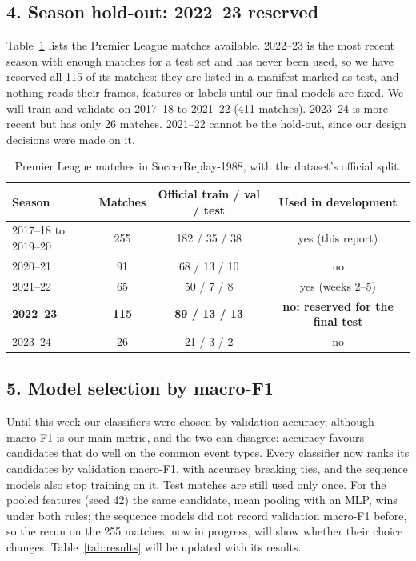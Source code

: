 \documentclass[11pt]{article}
\begin{document}
\subsection*{4. Season hold-out: 2022--23 reserved}
Table~\ref{tab:seasons} lists the Premier League matches available. 2022--23 is the most recent season with
enough matches for a test set and has never been used, so we have reserved all 115 of its matches: they are
listed in a manifest marked as test, and nothing reads their frames, features or labels until our final
models are fixed. We will train and validate on 2017--18 to 2021--22 (411 matches). 2023--24 is more recent
but has only 26 matches. 2021--22 cannot be the hold-out, since our design decisions were made on it.

\begin{table}[h]
\centering\small
\begin{tabular}{lccc}
\toprule
Season & Matches & Official train / val / test & Used in development\\
\midrule
2017--18 to 2019--20 & 255 & 182 / 35 / 38 & yes (this report)\\
2020--21 & 91 & 68 / 13 / 10 & no\\
2021--22 & 65 & 50 / 7 / 8 & yes (weeks 2--5)\\
\textbf{2022--23} & \textbf{115} & \textbf{89 / 13 / 13} & \textbf{no: reserved for the final test}\\
2023--24 & 26 & 21 / 3 / 2 & no\\
\bottomrule
\end{tabular}
\caption{Premier League matches in SoccerReplay-1988, with the dataset's official split.}
\label{tab:seasons}
\end{table}

\subsection*{5. Model selection by macro-F1}
Until this week our classifiers were chosen by validation accuracy, although macro-F1 is our main metric, and
the two can disagree: accuracy favours candidates that do well on the common event types. Every classifier now
ranks its candidates by validation macro-F1, with accuracy breaking ties, and the sequence models also stop
training on it. Test matches are still used only once. For the pooled features (seed 42) the same candidate,
mean pooling with an MLP, wins under both rules; the sequence models did not record validation macro-F1
before, so the rerun on the 255 matches, now in progress, will show whether their choice changes.
Table~\ref{tab:results} will be updated with its results.
\end{document}
